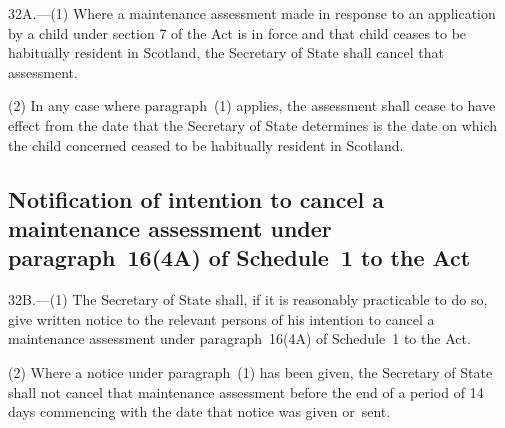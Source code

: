 \documentclass[a4paper,12pt]{article}
\begin{document}
32A.—(1) Where a maintenance assessment made in response to an application by a child under section 7 of the Act is in force and that child ceases to be habitually resident in Scotland, 
the Secretary of State  %
shall cancel that assessment.

(2) In any case where paragraph~(1) applies, the assessment shall cease to have effect from the date that 
the Secretary of State  %
determines is the date on which the child concerned ceased to be habitually resident in Scotland.


\subsection[32B. Notification of intention to cancel a maintenance assessment under paragraph~16(4A) of Schedule~1 to the Act]{Notification of intention to cancel a maintenance assessment under paragraph~16(4A) of Schedule~1 to the Act}

32B.—(1) 
The Secretary of State  %
shall, if it is reasonably practicable to do so, give written notice to the relevant persons of his intention to cancel a maintenance assessment under paragraph~16(4A) of Schedule~1 to the Act.

(2) Where a notice under paragraph~(1) has been given, 
the Secretary of State  %
shall not cancel that maintenance assessment before the end of a period of 14 days commencing with the date that notice was given or~sent.

\end{document}
